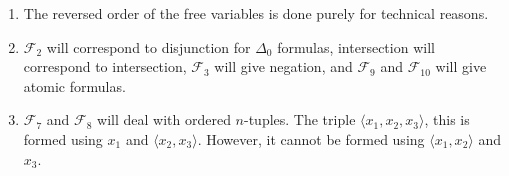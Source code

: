 \begin{remark}
    \begin{enumerate}
        \item The reversed order of the free variables is done purely for technical reasons.
        \item \( \mathcal F_2 \) will correspond to disjunction for \( \Delta_0 \) formulas, intersection will correspond to intersection, \( \mathcal F_3 \) will give negation, and \( \mathcal F_9 \) and \( \mathcal F_{10} \) will give atomic formulas.
        \item \( \mathcal F_7 \) and \( \mathcal F_8 \) will deal with ordered \( n \)-tuples.
        The triple \( \langle x_1, x_2, x_3 \rangle \), this is formed using \( x_1 \) and \( \langle x_2, x_3 \rangle \).
        However, it cannot be formed using \( \langle x_1, x_2 \rangle \) and \( x_3 \).
    \end{enumerate}
\end{remark}
